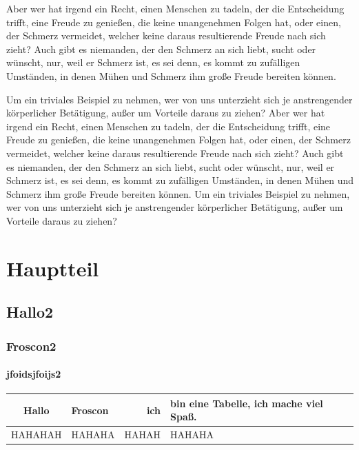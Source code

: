 \documentclass[12pt]{scrreprt}
\begin{document}
Aber wer hat irgend ein Recht, einen Menschen zu tadeln, der die Entscheidung trifft, eine Freude zu genießen, die keine unangenehmen Folgen hat, oder einen, der Schmerz vermeidet, welcher keine daraus resultierende Freude nach sich zieht? Auch gibt es niemanden, der den Schmerz an sich liebt, sucht oder wünscht, nur, weil er Schmerz ist, es sei denn, es kommt zu zufälligen Umständen, in denen Mühen und Schmerz ihm große Freude bereiten können.

Um ein triviales Beispiel zu nehmen, wer von uns unterzieht sich je anstrengender körperlicher Betätigung, außer um Vorteile daraus zu ziehen? Aber wer hat irgend ein Recht, einen Menschen zu tadeln, der die Entscheidung trifft, eine Freude zu genießen, die keine unangenehmen Folgen hat, oder einen, der Schmerz vermeidet, welcher keine daraus resultierende Freude nach sich zieht? Auch gibt es niemanden, der den Schmerz an sich liebt, sucht oder wünscht, nur, weil er Schmerz ist, es sei denn, es kommt zu zufälligen Umständen, in denen Mühen und Schmerz ihm große Freude bereiten können. Um ein triviales Beispiel zu nehmen, wer von uns unterzieht sich je anstrengender körperlicher Betätigung, außer um Vorteile daraus zu ziehen?

\chapter{Hauptteil}

\section{Hallo2}

\subsection{Froscon2}

\subsubsection{jfoidsjfoijs2}

\begin{tabular}{|c|l|r|p{4cm}|}  \hline
Hallo & Froscon & ich & bin eine Tabelle, ich mache viel Spaß. \\ \hline
HAHAHAH & HAHAHA & HAHAH & HAHAHA \\ \hline
\end{tabular}

\end{document}
